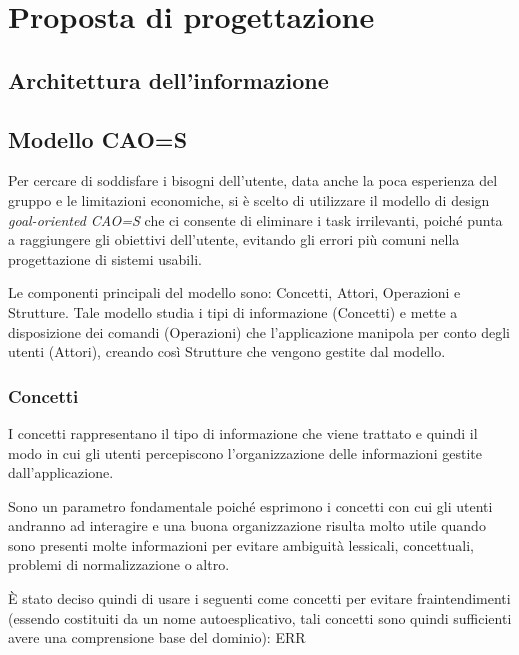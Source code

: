 \documentclass[12pt,italian,]{report}
\begin{document}
\hypertarget{proposta-di-progettazione}{%
\chapter{Proposta di progettazione}\label{proposta-di-progettazione}}

\hypertarget{architettura-dellinformazione}{%
\section{Architettura
dell'informazione}\label{architettura-dellinformazione}}

\hypertarget{modello-caos}{%
\section{Modello CAO=S}\label{modello-caos}}

Per cercare di soddisfare i bisogni dell'utente, data anche la poca
esperienza del gruppo e le limitazioni economiche, si è scelto di
utilizzare il modello di design \emph{goal-oriented CAO=S} che ci
consente di eliminare i task irrilevanti, poiché punta a raggiungere gli
obiettivi dell'utente, evitando gli errori più comuni nella
progettazione di sistemi usabili.

Le componenti principali del modello sono: ​Concetti, Attori​,
Operazioni​ e Strutture​. Tale modello studia i tipi di informazione
(Concetti) e mette a disposizione dei comandi (Operazioni) che
l'applicazione manipola per conto degli utenti (Attori), creando così
Strutture che vengono gestite dal modello.

\hypertarget{concetti}{%
\subsection{Concetti}\label{concetti}}

I concetti rappresentano il tipo di informazione che viene trattato e
quindi il modo in cui gli utenti percepiscono l'organizzazione delle
informazioni gestite dall'applicazione.

Sono un parametro fondamentale poiché esprimono i concetti con cui gli
utenti andranno ad interagire e una buona organizzazione risulta molto
utile quando sono presenti molte informazioni per evitare ambiguità
lessicali, concettuali, problemi di normalizzazione o altro.

È stato deciso quindi di usare i seguenti come concetti per evitare
fraintendimenti (essendo costituiti da un nome autoesplicativo, tali
concetti sono quindi sufficienti avere una comprensione base del
dominio): ERR
\end{document}
